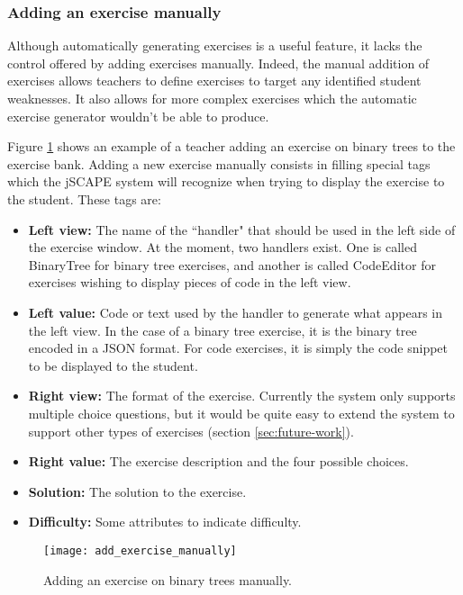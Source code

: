 \subsubsection{Adding an exercise manually}
Although automatically generating exercises is a useful feature, it lacks the control offered by adding exercises manually. Indeed, the manual addition of exercises allows teachers to define exercises to target any identified student weaknesses. It also allows for more complex exercises which the automatic exercise generator wouldn't be able to produce. \newline

Figure \ref{fig:add_exercise_manually} shows an example of a teacher adding an exercise on binary trees to the exercise bank. Adding a new exercise manually consists in filling special tags which the jSCAPE system will recognize when trying to display the exercise to the student. These tags are:

\begin{itemize}
\item \textbf{Left view:} The name of the ``handler" that should be used in the left side of the exercise window. At the moment, two handlers exist. One is called BinaryTree for binary tree exercises, and another is called CodeEditor for exercises wishing to display pieces of code in the left view.
\item \textbf{Left value:} Code or text used by the handler to generate what appears in the left view. In the case of a binary tree exercise, it is the binary tree encoded in a JSON format. For code exercises, it is simply the code snippet to be displayed to the student.
\item \textbf{Right view:} The format of the exercise. Currently the system only supports multiple choice questions, but it would be quite easy to extend the system to support other types of exercises (section \ref{sec:future-work}).
\item \textbf{Right value:} The exercise description and the four possible choices.
\item \textbf{Solution:} The solution to the exercise.
\item \textbf{Difficulty:} Some attributes to indicate difficulty.
\end{itemize}

\begin{figure}[H]
\centering
\texttt{[image: add\_exercise\_manually]}
\caption{Adding an exercise on binary trees manually.}
\label{fig:add_exercise_manually}
\end{figure}

